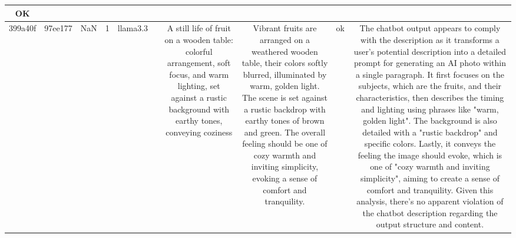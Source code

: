 \begin{table}[h!]
\begin{tabular}{|c|c|c|c|c|c|c|c|c|c|}
OK\\
\hline
399a40f & 97ee177 & NaN & 1 & llama3.3 &  & A still life of fruit on a wooden table: colorful arrangement, soft focus, and warm lighting, set against a rustic background with earthy tones, conveying coziness & Vibrant fruits are arranged on a weathered wooden table, their colors softly blurred, illuminated by warm, golden light. The scene is set against a rustic backdrop with earthy tones of brown and green. The overall feeling should be one of cozy warmth and inviting simplicity, evoking a sense of comfort and tranquility. & ok & The chatbot output appears to comply with the description as it transforms a user's potential description into a detailed prompt for generating an AI photo within a single paragraph. It first focuses on the subjects, which are the fruits, and their characteristics, then describes the timing and lighting using phrases like "warm, golden light". The background is also detailed with a "rustic backdrop" and specific colors. Lastly, it conveys the feeling the image should evoke, which is one of "cozy warmth and inviting simplicity", aiming to create a sense of comfort and tranquility. Given this analysis, there's no apparent violation of the chatbot description regarding the output structure and content.


\end{tabular}
\end{table}
